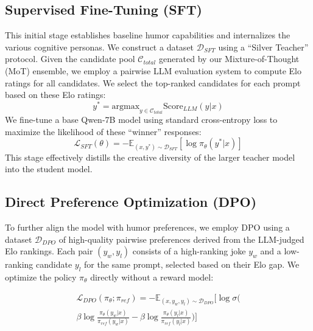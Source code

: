 \documentclass[11pt]{article}
\begin{document}
\subsection{Supervised Fine-Tuning (SFT)}
This initial stage establishes baseline humor capabilities and internalizes the various cognitive personas. We construct a dataset $\mathcal{D}_{SFT}$ using a ``Silver Teacher'' protocol. Given the candidate pool $\mathcal{C}_{total}$ generated by our Mixture-of-Thought (MoT) ensemble, we employ a pairwise LLM evaluation system to compute Elo ratings for all candidates. We select the top-ranked candidates for each prompt based on these Elo ratings:
$$ y^* = \text{argmax}_{y \in \mathcal{C}_{total}} \text{Score}_{LLM}(y|x) $$
We fine-tune a base Qwen-7B model using standard cross-entropy loss to maximize the likelihood of these ``winner'' responses:
$$ \mathcal{L}_{SFT}(\theta) = -\mathbb{E}_{(x, y^*) \sim \mathcal{D}_{SFT}} [ \log \pi_\theta(y^* | x) ] $$
This stage effectively distills the creative diversity of the larger teacher model into the student model.

\subsection{Direct Preference Optimization (DPO)}
To further align the model with humor preferences, we employ DPO using a dataset $\mathcal{D}_{DPO}$ of high-quality pairwise preferences derived from the LLM-judged Elo rankings. Each pair $(y_w, y_l)$ consists of a high-ranking joke $y_w$ and a low-ranking candidate $y_l$ for the same prompt, selected based on their Elo gap. We optimize the policy $\pi_\theta$ directly without a reward model:

\begin{multline}
\mathcal{L}_{DPO}(\pi_\theta; \pi_{ref}) = - \mathbb{E}_{(x, y_w, y_l) \sim \mathcal{D}_{DPO}} \Bigg[ \log \sigma \Bigg( \\
\beta \log \frac{\pi_\theta(y_w|x)}{\pi_{ref}(y_w|x)} - \beta \log \frac{\pi_\theta(y_l|x)}{\pi_{ref}(y_l|x)} \Bigg) \Bigg]
\end{multline}
\end{document}
